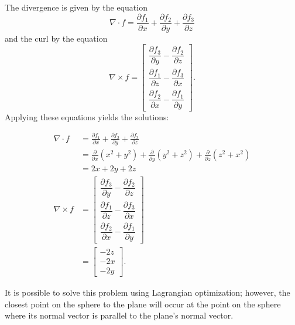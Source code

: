 \item

The divergence is given by the equation \[
 \nabla \cdot f = \frac{\partial f_1}{\partial x} + \frac{\partial f_2}{\partial y} + \frac{\partial f_3}{\partial z}
\] and the curl by the equation \[
 \nabla \times f = \begin{bmatrix}
  \dfrac{\partial f_3}{\partial y} - \dfrac{\partial f_2}{\partial z} \\
  \dfrac{\partial f_1}{\partial z} - \dfrac{\partial f_3}{\partial x} \\
  \dfrac{\partial f_2}{\partial x} - \dfrac{\partial f_1}{\partial y}
 \end{bmatrix}.
\]  Applying these equations yields the solutions:

\begin{align*}
 \nabla \cdot f &= \frac{\partial f_1}{\partial x} + \frac{\partial f_2}{\partial y} + \frac{\partial f_3}{\partial z} \\
 &= \frac{\partial}{\partial x}(x^2+y^2) + \frac{\partial}{\partial y}(y^2+z^2) + \frac{\partial}{\partial z}(z^2+x^2) \\
 &= 2x + 2y + 2z \\
 \nabla \times f &= \begin{bmatrix}
  \dfrac{\partial f_3}{\partial y} - \dfrac{\partial f_2}{\partial z} \\
  \dfrac{\partial f_1}{\partial z} - \dfrac{\partial f_3}{\partial x} \\
  \dfrac{\partial f_2}{\partial x} - \dfrac{\partial f_1}{\partial y}
 \end{bmatrix} \\
 &= \begin{bmatrix} - 2z \\ - 2x \\ - 2y \end{bmatrix}.
\end{align*}


\item

It is possible to solve this problem using Lagrangian optimization;
however, the closest point on the sphere to the plane will occur at
the point on the sphere where its normal vector is parallel to the plane's
normal vector.


